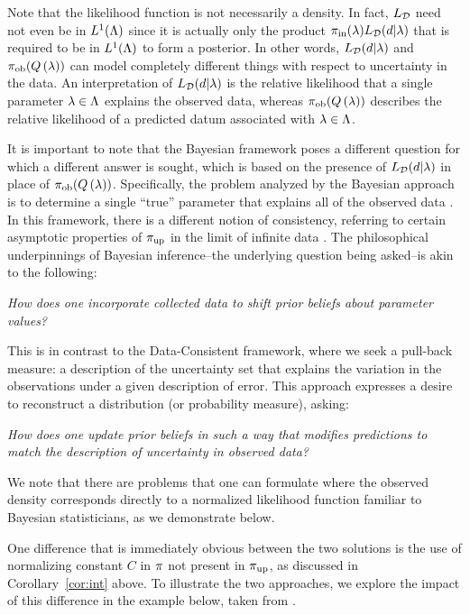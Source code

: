 Note that the likelihood function is not necessarily a density.
In fact, $L_{\mathcal{D}}$ need not even be in $L^1({\Lambda})$ since it is actually only the product $\operatorname*{\pi_{in}}(\lambda) L_{\mathcal{D}} (d | \lambda)$ that is required to be in $L^1({\Lambda})$ to form a posterior.
In other words, $L_{\mathcal{D}} (d | \lambda)$ and $\operatorname*{\pi_{ob}}(Q\left ( \lambda \right ))$ can model completely different things with respect to uncertainty in the data. 
An interpretation of $L_{\mathcal{D}} (d | \lambda)$ is the relative likelihood that a single parameter $\lambda\in{\Lambda}$ explains the observed data, whereas $\operatorname*{\pi_{ob}}(Q\left ( \lambda \right ))$ describes the relative likelihood of a predicted datum associated with $\lambda\in{\Lambda}$.

It is important to note that the Bayesian framework poses a different question for which a different answer is sought, which is based on the presence of $L_{\mathcal{D}}(d | \lambda)$ in place of $\operatorname*{\pi_{ob}}(Q\left ( \lambda \right ))$.
Specifically, the problem analyzed by the Bayesian approach is to determine a single ``true'' parameter that explains all of the observed data \cite{Smith, Concrete, Complete}.
In this framework, there is a different notion of consistency, referring to certain asymptotic properties of $\operatorname*{\pi_{up}}$ in the limit of infinite data \cite{Barron, Silverman}.
The philosophical underpinnings of Bayesian inference\---the underlying question being asked\---is akin to the following:

\begin{center}
  \emph{How does one incorporate collected data to shift prior beliefs about parameter values?}
\end{center}

This is in contrast to the Data-Consistent framework, where we seek a pull-back measure: a description of the uncertainty set that explains the variation in the observations under a given description of error.
This approach expresses a desire to reconstruct a distribution (or probability measure), asking:

\begin{center}
  \emph{How does one update prior beliefs in such a way that modifies predictions to match the description of uncertainty in observed data?}
\end{center}

We note that there are problems that one can formulate where the observed density corresponds directly to a normalized likelihood function familiar to Bayesian statisticians, as we demonstrate below.

One difference that is immediately obvious between the two solutions is the use of normalizing constant $C$ in $\pi$ not present in $\operatorname*{\pi_{up}}$, as discussed in Corollary~\ref{cor:int} above.
To illustrate the two approaches, we explore the impact of this difference in the example below, taken from \cite{BJW18}.


